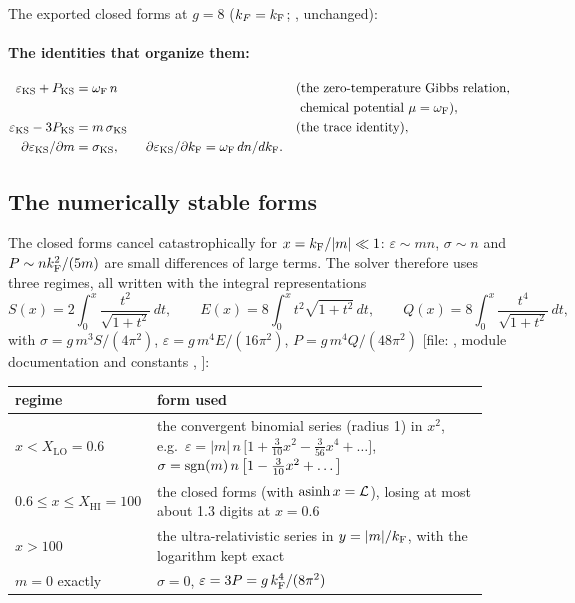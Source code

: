 The exported closed forms at $g=8$ ($k_F=k_{\mathrm{F}}$;
, unchanged):

{\footnotesize

}

\paragraph{The identities that organize them:}
\begin{align*}
  \varepsilon_{\mathrm{KS}}+P_{\mathrm{KS}}&=\omega_{\mathrm{F}}\,n &&\text{(the zero-temperature Gibbs relation,}\\
  & &&\ \text{chemical potential } \mu=\omega_{\mathrm{F}}),\\
  \varepsilon_{\mathrm{KS}}-3P_{\mathrm{KS}}&=m\,\sigma_{\mathrm{KS}} &&\text{(the trace identity)},\\
  \partial\varepsilon_{\mathrm{KS}}/\partial m&=\sigma_{\mathrm{KS}},\qquad \partial\varepsilon_{\mathrm{KS}}/\partial k_{\mathrm{F}}=\omega_{\mathrm{F}}\,dn/dk_{\mathrm{F}} .
\end{align*}
 

\subsection{The numerically stable forms}
\label{sec:8.5}

The closed forms cancel catastrophically for $x=k_{\mathrm{F}}/|m|\ll1$: $\varepsilon\sim mn$, $\sigma\sim n$ and
$P\sim nk_{\mathrm{F}}^2/(5m)$ are small differences of large terms. The solver therefore uses three regimes, all
written with the integral representations
\[
  S(x)=2\int_0^x\frac{t^2}{\sqrt{1+t^2}}\,dt,\qquad E(x)=8\int_0^x t^2\sqrt{1+t^2}\,dt,\qquad
  Q(x)=8\int_0^x\frac{t^4}{\sqrt{1+t^2}}\,dt,
\]
with $\sigma=g\,m^3S/(4\pi^2)$, $\varepsilon=g\,m^4E/(16\pi^2)$, $P=g\,m^4Q/(48\pi^2)$ [file:
, module documentation and constants
, ]:

{\small
\begin{longtable}{@{}p{0.25\linewidth}p{0.69\linewidth}@{}}
\toprule
\raggedright regime & \raggedright form used \tabularnewline
\midrule
\endhead
\raggedright $x<X_{\mathrm{LO}}=0.6$ & \raggedright the convergent binomial series (radius 1) in $x^2$, e.g.\ $\varepsilon=|m|\,n\,\bigl[1+\frac{3}{10}x^2-\frac{3}{56}x^4+\dots\bigr]$, $\sigma=\operatorname{sgn}(m)\,n\,\bigl[1-\frac{3}{10}x^2+\dots\bigr]$ \tabularnewline
\raggedright $0.6\leq x\leq X_{\mathrm{HI}}=100$ & \raggedright the closed forms (with $\operatorname{asinh} x=\mathcal L$), losing at most about 1.3 digits at $x=0.6$ \tabularnewline
\raggedright $x>100$ & \raggedright the ultra-relativistic series in $y=|m|/k_{\mathrm{F}}$, with the logarithm kept exact \tabularnewline
\raggedright $m=0$ exactly & \raggedright $\sigma=0$, $\varepsilon=3P=g\,k_{\mathrm{F}}^4/(8\pi^2)$ \tabularnewline
\bottomrule
\end{longtable}
}

